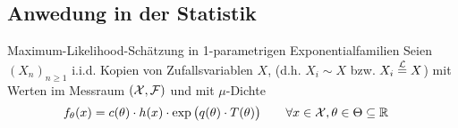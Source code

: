 \subsection{Anwedung in der Statistik} %
Maximum-Likelihood-Schätzung in 1-parametrigen Exponentialfamilien
Seien $(X_n)_{n\geq1}$ i.i.d. Kopien von Zufallsvariablen $X$, (d.h. $X_i\sim X$ bzw. $X_i\overset{\mathcal{L}}{=}X$)
mit Werten im Messraum $(\mathcal{X},\mathcal{F})$ und mit $\mu$-Dichte 
\begin{align*}
	f_\theta(x)&=c(\theta)\cdot h(x)\cdot\exp\big(q(\theta)\cdot T(\theta)\big)
	\qquad\forall x\in\mathcal{X},\theta\in\Theta\subseteq\mathbb{R}
\end{align*}




